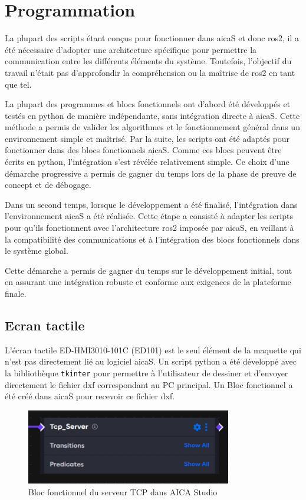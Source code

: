 \chapter{Programmation}
\label{chap:programmation}

La plupart des scripts étant conçus pour fonctionner dans \gls{aicaS} et donc \gls{ros2}, il a été nécessaire d'adopter une architecture spécifique pour permettre la communication entre les différents éléments du système. Toutefois, l'objectif du travail n'était pas d'approfondir la compréhension ou la maîtrise de \gls{ros2} en tant que tel.

La plupart des programmes et blocs fonctionnels ont d'abord été développés et testés en \gls{python} de manière indépendante, sans intégration directe à \gls{aicaS}. Cette méthode a permis de valider les algorithmes et le fonctionnement général dans un environnement simple et maîtrisé. Par la suite, les scripts ont été adaptés pour fonctionner dans des blocs fonctionnels \gls{aicaS}. Comme ces blocs peuvent être écrits en \gls{python}, l'intégration s'est révélée relativement simple. Ce choix d'une démarche progressive a permis de gagner du temps lors de la phase de preuve de concept et de débogage.

Dans un second temps, lorsque le développement a été finalisé, l'intégration dans l'environnement \gls{aicaS} a été réalisée. Cette étape a consisté à adapter les scripts pour qu'ils fonctionnent avec l'architecture \gls{ros2} imposée par \gls{aicaS}, en veillant à la compatibilité des communications et à l'intégration des blocs fonctionnels dans le système global.

Cette démarche a permis de gagner du temps sur le développement initial, tout en assurant une intégration robuste et conforme aux exigences de la plateforme finale.

\clearpage
\section{Ecran tactile}
L'écran tactile \gls{ED-HMI3010-101C} (ED101) est le seul élément de la maquette qui n'est pas directement lié au logiciel \gls{aicaS}. Un script \gls{python} a été développé avec la bibliothèque \texttt{tkinter} pour permettre à l'utilisateur de dessiner et d'envoyer directement le fichier \gls{dxf} correspondant au PC principal. Un Bloc fonctionnel a été créé dans \gls{aicaS} pour recevoir ce fichier \gls{dxf}.

\begin{figure}[H]
    \centering
    \includegraphics[width=0.8\textwidth]{assets/figures/AICA_Tcp_Server.png}
    \caption{Bloc fonctionnel du serveur TCP dans AICA Studio}
    \label{fig:touchscreen_interface}
\end{figure}

